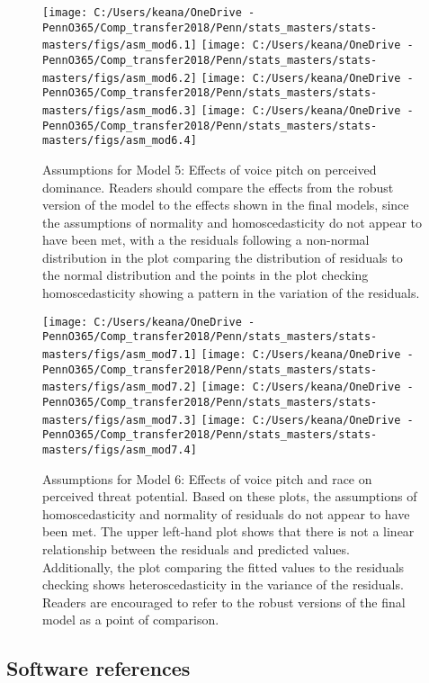 \documentclass[
  english,
  man, noextraspace,floatsintext]{apa6}
\begin{document}
\begin{figure}
\texttt{[image: C:/Users/keana/OneDrive - PennO365/Comp\_transfer2018/Penn/stats\_masters/stats-masters/figs/asm\_mod6.1]} \texttt{[image: C:/Users/keana/OneDrive - PennO365/Comp\_transfer2018/Penn/stats\_masters/stats-masters/figs/asm\_mod6.2]} \texttt{[image: C:/Users/keana/OneDrive - PennO365/Comp\_transfer2018/Penn/stats\_masters/stats-masters/figs/asm\_mod6.3]} \texttt{[image: C:/Users/keana/OneDrive - PennO365/Comp\_transfer2018/Penn/stats\_masters/stats-masters/figs/asm\_mod6.4]} \caption{Assumptions for Model 5: Effects of voice pitch on perceived dominance. Readers should compare the effects from the robust version of the model to the effects shown in the final models, since the assumptions of normality and homoscedasticity do not appear to have been met, with a the residuals following a non-normal distribution in the plot comparing the distribution of residuals to the normal distribution and the points in the plot checking homoscedasticity showing a pattern in the variation of the residuals.}\label{fig:f21}
\end{figure}

\begin{figure}
\texttt{[image: C:/Users/keana/OneDrive - PennO365/Comp\_transfer2018/Penn/stats\_masters/stats-masters/figs/asm\_mod7.1]} \texttt{[image: C:/Users/keana/OneDrive - PennO365/Comp\_transfer2018/Penn/stats\_masters/stats-masters/figs/asm\_mod7.2]} \texttt{[image: C:/Users/keana/OneDrive - PennO365/Comp\_transfer2018/Penn/stats\_masters/stats-masters/figs/asm\_mod7.3]} \texttt{[image: C:/Users/keana/OneDrive - PennO365/Comp\_transfer2018/Penn/stats\_masters/stats-masters/figs/asm\_mod7.4]} \caption{Assumptions for Model 6: Effects of voice pitch and race on perceived threat potential. Based on these plots, the assumptions of homoscedasticity and normality of residuals do not appear to have been met. The upper left-hand plot shows that there is not a linear relationship between the residuals and predicted values. Additionally, the plot comparing the fitted values to the residuals checking shows heteroscedasticity in the variance of the residuals. Readers are encouraged to refer to the robust versions of the final model as a point of comparison.}\label{fig:f22}
\end{figure}

\hypertarget{software-references}{%
\subsection{Software references}\label{software-references}}
\end{document}
